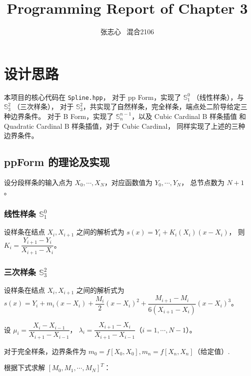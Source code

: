 \documentclass[lang=cn,a4paper,newtx,bibend=bibtex]{elegantpaper}
\title{Programming Report of Chapter 3}
\author{张志心 \ 混合2106}
\date{\zhdate{2024/01/04}}
\newcommand{\SBB}{\mathbb{S}}
\begin{document}
\maketitle

\section{设计思路}

本项目的核心代码在 \lstinline{Spline.hpp}，
对于 pp Form，实现了 $\SBB_1^0$ （线性样条），与 $\SBB_3^2$ （三次样条），
对于 $\SBB_3^2$，共实现了自然样条，完全样条，端点处二阶导给定三种边界条件。
对于 B Form，实现了 $\SBB_n^{n-1}$，以及 Cubic Cardinal B 样条插值
和 Quadratic Cardinal B 样条插值，对于 Cubic Cardinal，
同样实现了上述的三种边界条件。

\subsection{ppForm 的理论及实现}

设分段样条的输入点为 $X_0, \cdots, X_N$，对应函数值为 $Y_0, \cdots, Y_N$，
总节点数为 $N+1$。

\subsubsection{线性样条 $\SBB_1^0$}

设样条在结点 $X_i, X_{i+1}$ 之间的解析式为 $s(x) = Y_i + K_i(X_i)(x-X_i)$，
则 $K_i = \dfrac{Y_{i+1} - Y_i}{X_{i+1} - X_i}$。

\subsubsection{三次样条 $\SBB_3^2$}

设样条在结点 $X_i, X_{i+1}$ 之间的解析式为 $s(x) = Y_i + m_i(x-X_i) + 
\dfrac{M_i}2 (x-X_i)^2 + \dfrac{M_{i+1} - M_i}{6(X_{i+1} - X_i)}(x-X_i)^3$。

设 $\mu_i = \dfrac{X_i - X_{i - 1}}{X_{i + 1} - X_{i - 1}}$，
$\lambda_i = \dfrac{X_{i+1} - X_i}{X_{i + 1} - X_{i - 1}}$（$i = 1, \cdots, N-1$）。

对于完全样条，边界条件为 $m_0 = f[X_0, X_0], m_n = f[X_n, X_n]$（给定值）.

根据下式求解 $[M_0, M_1, \cdots, M_N]^T$：
\end{document}
